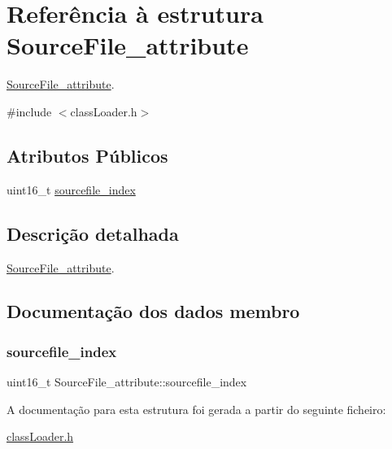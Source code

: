 \hypertarget{struct_source_file__attribute}{}\section{Referência à estrutura Source\+File\+\_\+attribute}
\label{struct_source_file__attribute}


\hyperlink{struct_source_file__attribute}{Source\+File\+\_\+attribute}.  




{\ttfamily \#include $<$class\+Loader.\+h$>$}

\subsection*{Atributos Públicos}
\begin{DoxyCompactItemize}
\item 
uint16\+\_\+t \hyperlink{struct_source_file__attribute_a6d137199011521de6186c445f75345f2}{sourcefile\+\_\+index}
\end{DoxyCompactItemize}


\subsection{Descrição detalhada}
\hyperlink{struct_source_file__attribute}{Source\+File\+\_\+attribute}. 

\subsection{Documentação dos dados membro}
\hypertarget{struct_source_file__attribute_a6d137199011521de6186c445f75345f2}{}\label{struct_source_file__attribute_a6d137199011521de6186c445f75345f2} 
\subsubsection{\texorpdfstring{sourcefile\+\_\+index}{sourcefile\_index}}
{\footnotesize\ttfamily uint16\+\_\+t Source\+File\+\_\+attribute\+::sourcefile\+\_\+index}



A documentação para esta estrutura foi gerada a partir do seguinte ficheiro\+:\begin{DoxyCompactItemize}
\item 
\hyperlink{class_loader_8h}{class\+Loader.\+h}\end{DoxyCompactItemize}

